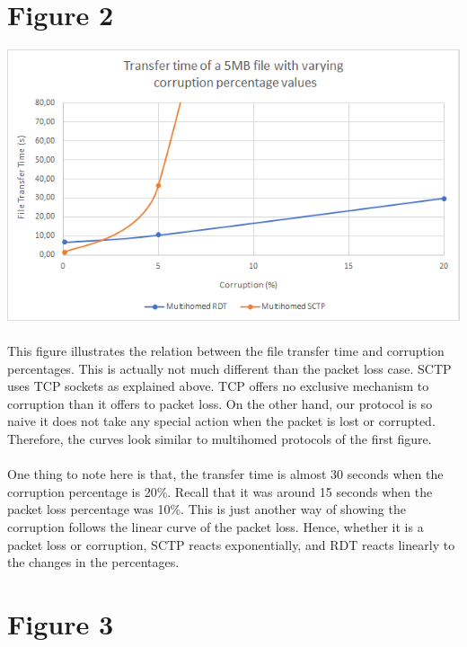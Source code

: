 \documentclass[12pt]{article}
\begin{document}
\section*{Figure 2}

\includegraphics[scale=0.8]{graph2.png}
\\\\
This figure illustrates the relation between the file transfer time and corruption percentages. This is actually not much different than the packet loss case. SCTP uses TCP sockets as explained above. TCP offers no exclusive mechanism to corruption than it offers to packet loss. On the other hand, our protocol is so naive it does not take any special action when the packet is lost or corrupted. Therefore, the curves look similar to multihomed protocols of the first figure.\\\\ One thing to note here is that, the transfer time is almost 30 seconds when the corruption percentage is 20\%. Recall that it was around 15 seconds when the packet loss percentage was 10\%. This is just another way of showing the corruption follows the linear curve of the packet loss. Hence, whether it is a packet loss or corruption, SCTP reacts exponentially, and RDT reacts linearly to the changes in the percentages.


\section*{Figure 3}
\end{document}
